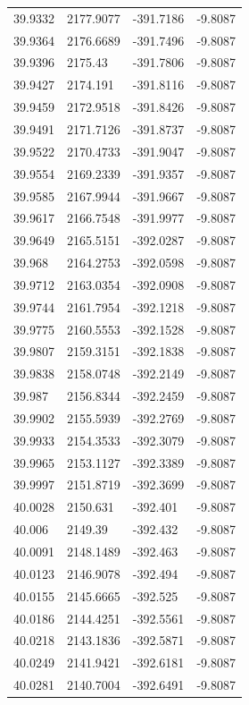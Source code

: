 \begin{table}[H]
\begin{tabular}{llll}
39.9332 & 2177.9077 & -391.7186 & -9.8087 \\
39.9364 & 2176.6689 & -391.7496 & -9.8087 \\
39.9396 & 2175.43 & -391.7806 & -9.8087 \\
39.9427 & 2174.191 & -391.8116 & -9.8087 \\
39.9459 & 2172.9518 & -391.8426 & -9.8087 \\
39.9491 & 2171.7126 & -391.8737 & -9.8087 \\
39.9522 & 2170.4733 & -391.9047 & -9.8087 \\
39.9554 & 2169.2339 & -391.9357 & -9.8087 \\
39.9585 & 2167.9944 & -391.9667 & -9.8087 \\
39.9617 & 2166.7548 & -391.9977 & -9.8087 \\
39.9649 & 2165.5151 & -392.0287 & -9.8087 \\
39.968 & 2164.2753 & -392.0598 & -9.8087 \\
39.9712 & 2163.0354 & -392.0908 & -9.8087 \\
39.9744 & 2161.7954 & -392.1218 & -9.8087 \\
39.9775 & 2160.5553 & -392.1528 & -9.8087 \\
39.9807 & 2159.3151 & -392.1838 & -9.8087 \\
39.9838 & 2158.0748 & -392.2149 & -9.8087 \\
39.987 & 2156.8344 & -392.2459 & -9.8087 \\
39.9902 & 2155.5939 & -392.2769 & -9.8087 \\
39.9933 & 2154.3533 & -392.3079 & -9.8087 \\
39.9965 & 2153.1127 & -392.3389 & -9.8087 \\
39.9997 & 2151.8719 & -392.3699 & -9.8087 \\
40.0028 & 2150.631 & -392.401 & -9.8087 \\
40.006 & 2149.39 & -392.432 & -9.8087 \\
40.0091 & 2148.1489 & -392.463 & -9.8087 \\
40.0123 & 2146.9078 & -392.494 & -9.8087 \\
40.0155 & 2145.6665 & -392.525 & -9.8087 \\
40.0186 & 2144.4251 & -392.5561 & -9.8087 \\
40.0218 & 2143.1836 & -392.5871 & -9.8087 \\
40.0249 & 2141.9421 & -392.6181 & -9.8087 \\
40.0281 & 2140.7004 & -392.6491 & -9.8087 \\

\end{tabular}
\end{table}
